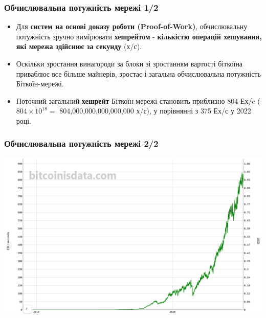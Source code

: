 \documentclass{beamer}
\begin{document}
\begin{frame}
  \frametitle{Обчислювальна потужність мережі 1/2}
  \begin{itemize}
  \item Для \textbf{систем на основі доказу роботи (Proof-of-Work)},
    обчислювальну потужність зручно вимірювати \textbf{хешрейтом} -
    \textbf{кількістю операцій хешування, які мережа здійснює за секунду} (х/с).
  \item Оскільки зростання винагороди за блоки зі зростанням вартості біткоїна
    приваблює все більше майнерів, зростає і загальна обчислювальна потужність
    Біткоїн-мережі.
  \item Поточний загальний \textbf{хешрейт} Біткоїн-мережі становить приблизно
    804 Ех/c ($804 \times 10^{18} = $ 804,000,000,000,000,000 х/с), у порівнянні
    з 375 Ех/с у 2022 році.
  \end{itemize}
\end{frame}

\begin{frame}
  \frametitle{Обчислювальна потужність мережі 2/2}
  \includegraphics[width=\textwidth]{hashrate}
\end{frame}
\end{document}
